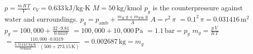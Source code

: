 \( p = \frac{m \, R \, T}{V} \)  
\( c_V = 0.633 \, \text{kJ/kg·K} \)  
\( M = 50 \, \text{kg/kmol} \)  
\( p_g \) is the counterpressure against water and surroundings.  
\( p_g = p_{\text{amb}} + \frac{m_K \, g + m_{\text{EW}} \, g}{A} \)  
\( A = r^2 \, \pi \)  
\( = 0.1^2 \, \pi = 0.031416 \, \text{m}^2 \)  
\( p_g = 100,000 + \frac{32 \cdot 9.81}{0.0319} \)  
\( = 100,000 + 10,000 \, \text{Pa} \)  
\( = 1.1 \, \text{bar} = p_g \)  
\( m_g = \frac{p \, V}{R \, T} \)  
\( = \frac{110,000 \cdot 0.0319}{\frac{8,314 \, \text{kJ/kg·K}}{50 \, \text{kmol}} \cdot (500 + 273.15 \, \text{K})} \)  
\( = 0.002687 \, \text{kg} = m_g \)